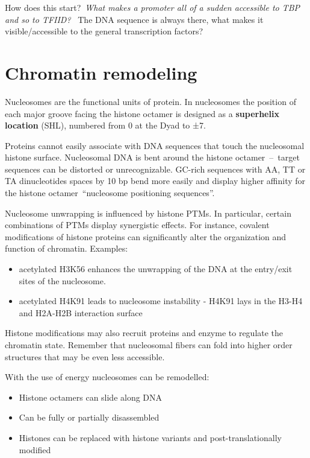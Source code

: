 How does this start?~\emph{What makes a promoter all of a sudden accessible to TBP and so to TFIID?}~ The DNA sequence is always there, what makes it visible/accessible to the general transcription factors?

\hypertarget{chromatin-remodeling}{%
\section{Chromatin remodeling}\label{chromatin-remodeling}}

Nucleosomes are the functional units of protein. In nucleosomes the position of each major groove facing the histone octamer is designed as a \textbf{superhelix location} (SHL), numbered from 0 at the Dyad to ±7.

Proteins cannot easily associate with DNA sequences that touch the nucleosomal histone surface. Nucleosomal DNA is bent around the histone octamer~--~target sequences can be distorted or unrecognizable. GC-rich sequences with AA, TT or TA dinucleotides spaces by 10 bp bend more easily and display higher affinity for the histone octamer~``nucleosome positioning sequences''.

Nucleosome unwrapping is influenced by histone PTMs. In particular, certain combinations of PTMs display synergistic effects. For instance, covalent modifications of histone proteins can significantly alter the organization and function of chromatin. Examples:

\begin{itemize}
\tightlist
\item
  acetylated H3K56 enhances the unwrapping of the DNA at the entry/exit sites of the nucleosome.
\item
  acetylated H4K91 leads to nucleosome instability - H4K91 lays in the H3-H4 and H2A-H2B interaction surface
\end{itemize}

Histone modifications may also recruit proteins and enzyme to regulate the chromatin state. Remember that nucleosomal fibers can fold into higher order structures that may be even less accessible.

With the use of energy nucleosomes can be remodelled:
\begin{itemize}
\tightlist
\item
Histone octamers can slide along DNA
\item
Can be fully or partially disassembled
\item
Histones can be replaced with histone variants and post-translationally modified
\end{itemize}

